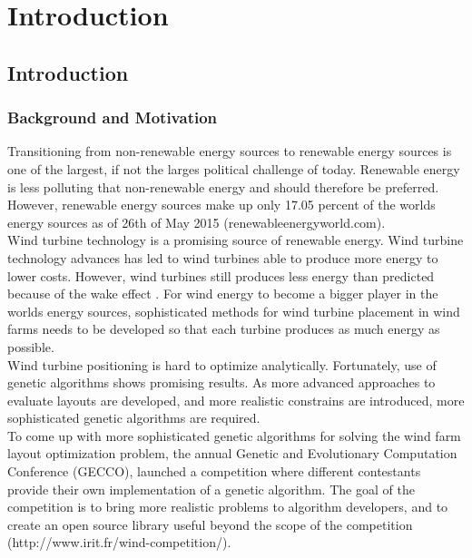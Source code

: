 \chapter{Introduction}


\section{Introduction}


\subsection{Background and Motivation}
Transitioning from non-renewable energy sources to renewable energy sources is one of the largest, if not the larges political challenge of today. Renewable energy is less polluting that non-renewable energy and should therefore be preferred. However, renewable energy sources make up only 17.05 percent of the worlds energy sources as of 26th of May 2015 (renewableenergyworld.com). \\

\noindent Wind turbine technology is a promising source of renewable energy. Wind turbine technology advances has led to wind turbines able to produce more energy to lower costs. However, wind turbines still produces less energy than predicted because of the wake effect \citep{Samorani}. For wind energy to become a bigger player in the worlds energy sources, sophisticated methods for wind turbine placement in wind farms needs to be developed so that each turbine produces as much energy as possible. \\

\noindent Wind turbine positioning is hard to optimize analytically. Fortunately, use of genetic algorithms shows promising results. As more advanced approaches to evaluate layouts are developed, and more realistic constrains are introduced, more sophisticated genetic algorithms are required. \\

\noindent To come up with more sophisticated genetic algorithms for solving the wind farm layout optimization problem, the annual Genetic and Evolutionary Computation Conference (GECCO), launched a competition where different contestants provide their own implementation of a genetic algorithm. The goal of the competition is to bring more realistic problems to algorithm developers, and to create an open source library useful beyond the scope of the competition (http://www.irit.fr/wind-competition/). \\

